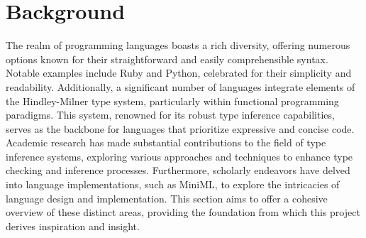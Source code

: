 \documentclass{l4proj}
\begin{document}




    


\chapter{Background}

The realm of programming languages boasts a rich diversity, offering numerous options known for their straightforward and easily comprehensible syntax.
Notable examples include Ruby and Python, celebrated for their simplicity and readability.
Additionally, a significant number of languages integrate elements of the Hindley-Milner type system, particularly within functional programming paradigms.
This system, renowned for its robust type inference capabilities, serves as the backbone for languages that prioritize expressive and concise code.
Academic research has made substantial contributions to the field of type inference systems, exploring various approaches and techniques to enhance type checking and inference processes.
Furthermore, scholarly endeavors have delved into language implementations, such as MiniML, to explore the intricacies of language design and implementation.
This section aims to offer a cohesive overview of these distinct areas, providing the foundation from which this project derives inspiration and insight.
\end{document}
